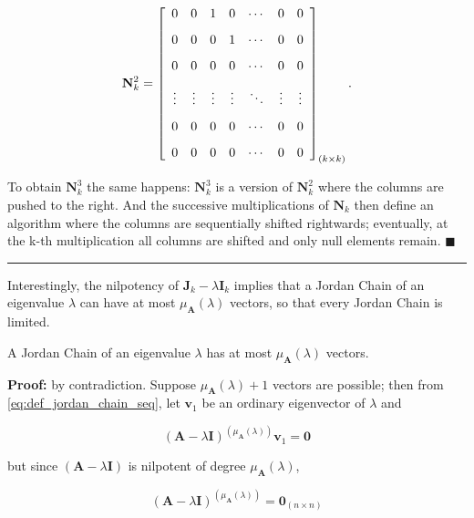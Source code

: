 \begin{equation}
	\mathbf{N}_k^2 = \left[\raisebox{15mm}{} \begin{array}{ccccccc} 0 & 0 & 1 & 0 & \cdots & 0 & 0 \\[3mm] 0 & 0 & 0 & 1 & \cdots & 0 & 0 \\[3mm] 0 & 0 & 0 & 0 & \cdots & 0 & 0 \\[3mm] \vdots & \vdots & \vdots & \vdots & \ddots & \vdots & \vdots \\[3mm] 0 & 0 & 0 & 0 & \cdots & 0 & 0 \\[3mm] 0 & 0 & 0 & 0 & \cdots & 0 & 0 \end{array}\right]_{(k\times k)}.
\end{equation}

	To obtain $\mathbf{N}_k^3$ the same happens: $\mathbf{N}_k^3$ is a version of $\mathbf{N}_k^2$ where the columns are pushed to the right. And the successive multiplications of $\mathbf{N}_k$ then define an algorithm where the columns are sequentially shifted rightwards; eventually, at the k-th multiplication all columns are shifted and only null elements remain.
\hfill$\blacksquare$
\vspace{5mm}
\hrule
\vspace{5mm} %

	Interestingly, the nilpotency of $\mathbf{J}_k - \lambda\mathbf{I}_k$ implies that a Jordan Chain of an eigenvalue $\lambda$ can have at most $\mu_\mathbf{A}\left(\lambda\right)$ vectors, so that every Jordan Chain is limited.

\begin{corollary}\label{corollary:jordan_nk_at_most} %
	A Jordan Chain of an eigenvalue $\lambda$ has at most $\mu_\mathbf{A}\left(\lambda\right)$ vectors.
\end{corollary}
\noindent\textbf{Proof:} by contradiction. Suppose $\mu_\mathbf{A}\left(\lambda\right)+1$ vectors are possible; then from \eqref{eq:def_jordan_chain_seq}, let $\mathbf{v}_1$ be an ordinary eigenvector of $\lambda$ and

\begin{equation} \left(\mathbf{A} - \lambda\mathbf{I}\right)^{\left(\mu_\mathbf{A}\left(\lambda\right)\right)}\mathbf{v}_1 = \mathbf{0} \label{eq:jordanchain_nilpotent}\end{equation}

	\noindent but since $\left(\mathbf{A} - \lambda\mathbf{I}\right)$ is nilpotent of degree $\mu_\mathbf{A}\left(\lambda\right)$,

\begin{equation} \left(\mathbf{A} - \lambda\mathbf{I}\right)^{\left(\mu_\mathbf{A}\left(\lambda\right)\right)} = \mathbf{0}_{(n\times n)} \end{equation}

